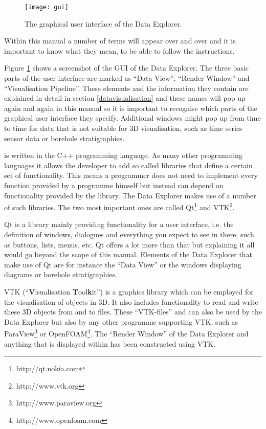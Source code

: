 \begin{figure}[tb]
\begin{center}
\texttt{[image: gui]}
\caption{The graphical user interface of the \ogs Data Explorer.}
\label{fig:gui}
\end{center}
\end{figure}

Within this manual a number of terms will appear over and over and it is important to know what they mean, to be able to follow the instructions.

Figure \ref{fig:gui} shows a screenshot of the GUI of the \ogs Data Explorer. The three basic parts of the user interface are marked as ``Data View'', ``Render Window'' and ``Visualisation Pipeline''. These elements and the information they contain are explained in detail in section \ref{datavisualisation} and these names will pop up again and again in this manual so it is important to recognise which parts of the graphical user interface they specify. Additional windows might pop up from time to time for data that is not suitable for 3D visualisation, such as time series sensor data or borehole stratigraphies. 

\ogs is written in the C++ programming language. As many other programming languages it allows the developer to add so called libraries that define a certain set of functionality. This means a programmer does not need to implement every function provided by a programme himself but instead can depend on functionality provided by the library. The Data Explorer makes use of a number of such libraries. The two most important ones are called Qt\footnote{http://qt.nokia.com} and VTK\footnote{http://www.vtk.org}. 

Qt is a library mainly providing functionality for a user interface, i.e. the definition of windows, dialogues and everything you expect to see in there, such as buttons, lists, menus, etc. Qt offers a lot more than that but explaining it all would go beyond the scope of this manual. Elements of the Data Explorer that make use of Qt are for instance the ``Data View'' or the windows displaying diagrams or borehole stratigraphies.

VTK (``\textbf{V}isualisation \textbf{T}ool\textbf{k}it'') is a graphics library which can be employed for the visualisation of objects in 3D. It also includes functionality to read and write these 3D objects from and to files. These ``VTK-files'' and can also be used by the Data Explorer but also by any other programme supporting VTK, such as ParaView\footnote{http://www.paraview.org} or OpenFOAM\footnote{http://www.openfoam.com}. The ``Render Window'' of the Data Explorer and anything that is displayed within has been constructed using VTK.

